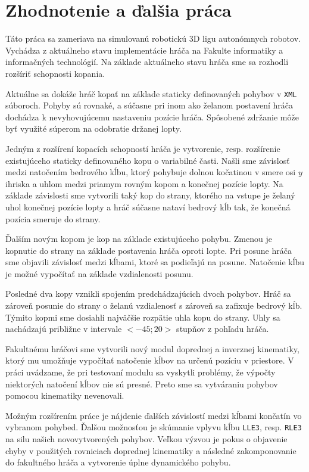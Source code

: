 \section{Zhodnotenie a ďalšia práca} \label{sec_conclusion}

Táto práca sa zameriava na simulovanú robotickú 3D ligu autonómnych robotov. Vychádza z aktuálneho stavu implementácie hráča na Fakulte informatiky a informačných technológií. Na základe aktuálneho stavu hráča sme sa rozhodli rozšíriť schopnosti kopania.

Aktuálne sa dokáže hráč kopať na základe staticky definovaných pohybov v \texttt{XML} súboroch. Pohyby sú rovnaké, a súčasne pri inom ako želanom postavení hráča dochádza k nevyhovujúcemu nastaveniu pozície hráča. Spôsobené zdržanie môže byť využité súperom na odobratie držanej lopty.

Jedným z rozšírení kopacích schopností hráča je vytvorenie, resp. rozšírenie existujúceho staticky definovaného kopu o variabilné časti. Našli sme závislosť medzi natočením bedrového kĺbu, ktorý pohybuje dolnou kočatinou v smere osi $y$ ihriska a uhlom medzi priamym rovným kopom a konečnej pozície lopty. Na základe závislosti sme vytvorili taký kop do strany, ktorého na vstupe je želaný uhol konečnej pozície lopty a hráč súčasne nataví bedrový kĺb tak, že konečná pozícia smeruje do strany.

Ďalším novým kopom je kop na základe existujúceho pohybu. Zmenou je kopnutie do strany na základe postavenia hráča oproti lopte. Pri posune hráča sme objavili závislosť medzi kĺbami, ktoré sa podieľajú na posune. Natočenie kĺbu je možné vypočítať na základe vzdialenosti posunu.

Posledné dva kopy vznikli spojením predchádzajúcich dvoch pohybov. Hráč sa zároveň posunie do strany o želanú vzdialenosť s zároveň sa zafixuje bedrový kĺb. Týmito kopmi sme dosiahli najväčšie rozpätie uhla kopu do strany. Uhly sa nachádzajú približne v intervale $<-45;20>$ stupňov z pohľadu hráča.

Fakultnému hráčovi sme vytvorili nový modul doprednej a inverznej kinematiky, ktorý mu umožňuje vypočítať natočenie kĺbov na určenú pozíciu v priestore. V práci uvádzame, že pri testovaní modulu sa vyskytli problémy, že výpočty niektorých natočení kĺbov nie sú presné. Preto sme sa vytváraniu pohybov pomocou kinematiky nevenovali.

Možným rozšírením práce je nájdenie ďalších závislostí medzi kĺbami končatín vo vybranom pohybed. Ďalšou možnosťou je skúmanie vplyvu kĺbu \texttt{LLE3}, resp. \texttt{RLE3} na silu našich novovytvorených pohybov. Veľkou výzvou je pokus o objavenie chyby v použitých rovniciach doprednej kinematiky a následné zakomponovanie do fakultného hráča a vytvorenie úplne dynamického pohybu.